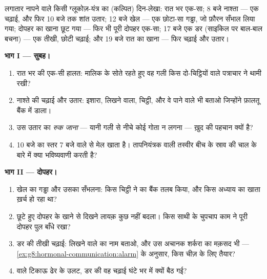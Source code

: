 \begin{problem}\label{pb:g8:hormonal-communication:1}
लगातार नापने वाले किसी ग्लूकोज़-यंत्र का (कल्पित) दिन-लेखा: रात भर
एक-सा; 8 बजे नाश्ता --- एक चढ़ाई, और फिर 10 बजे तक शांत उतार; 12 बजे
खेल --- एक छोटा-सा गड्ढा, जो फ़ौरन सँभाल लिया गया; दोपहर का खाना छूट
गया --- फिर भी पूरी दोपहर एक-सा; 17 बजे एक डर (साइकिल पर बाल-बाल बचना)
--- एक तीखी, छोटी चढ़ाई; और 19 बजे रात का खाना --- फिर चढ़ाई और उतार।

\medskip\noindent\textbf{भाग I --- सुबह।}
\begin{enumerate}
  \item रात भर की एक-सी हालत: मालिक के सोते रहते हुए वह गली किस
        दो-चिट्ठियों वाले पत्राचार ने थामी रखी?
  \item नाश्ते की चढ़ाई और उतार: इशारा, लिखने वाला, चिट्ठी, और वे
        पाने वाले भी बताओ जिन्होंने फ़ालतू बैंक में डाला।
  \item उस उतार का \emph{रुक जाना} --- यानी गली से नीचे कोई गोता न
        लगना --- ख़ुद  की पहचान क्यों है?
  \item 10 बजे का स्तर 7 बजे वाले से मेल खाता है। तापनियंत्रक वाली
        तस्वीर बीच के स्राव की चाल के बारे में क्या भविष्यवाणी करती
        है?
\end{enumerate}

\medskip\noindent\textbf{भाग II --- दोपहर।}
\begin{enumerate}[resume]
  \item खेल का गड्ढा और उसका सँभलना: किस चिट्ठी ने  का बैंक तलब
        किया, और किस अध्याय का खाता ख़र्च हो रहा था?
  \item छूटे हुए दोपहर के खाने से दिखने लायक़ कुछ नहीं बदला। किस साथी
         के चुपचाप काम ने पूरी दोपहर पुल बाँधे रखा?
  \item डर की तीखी चढ़ाई: लिखने वाले का नाम बताओ, और उस अचानक शर्करा
        का मक़सद भी --- \cref{ex:g8:hormonal-communication:alarm} के
        अनुसार, किस चीज़ के लिए तैयार?
  \item {} वाले टिकाऊ ढेर के उलट, डर की वह चढ़ाई घंटे भर में क्यों
        बैठ गई?
\end{enumerate}


\end{problem}
